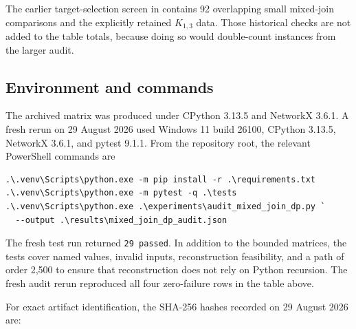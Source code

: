 \documentclass[11pt,a4paper]{article}
\providecommand{\Needspace}[1]{}
\numberwithin{equation}{section}
\begin{document}
The earlier target-selection screen in
 contains 92
overlapping small mixed-join comparisons and the explicitly retained
\(K_{1,3}\) data. Those historical checks are not added to the table
totals, because doing so would double-count instances from the larger
audit.

\subsection{Environment and commands}\label{sec:environment}

The archived matrix was produced under CPython 3.13.5 and NetworkX
3.6.1. A fresh rerun on 29 August 2026 used Windows 11 build 26100,
CPython 3.13.5, NetworkX 3.6.1, and pytest 9.1.1. From the repository
root, the relevant PowerShell commands are

\begin{verbatim}
.\.venv\Scripts\python.exe -m pip install -r .\requirements.txt
.\.venv\Scripts\python.exe -m pytest -q .\tests
.\.venv\Scripts\python.exe .\experiments\audit_mixed_join_dp.py `
  --output .\results\mixed_join_dp_audit.json
\end{verbatim}

The fresh test run returned \texttt{29\ passed}. In addition to the
bounded matrices, the tests cover named values, invalid inputs,
reconstruction feasibility, and a path of order 2,500 to ensure that
reconstruction does not rely on Python recursion. The fresh audit rerun
reproduced all four zero-failure rows in the table above.

\Needspace{7\baselineskip}
For exact artifact identification, the SHA-256 hashes recorded on 29
August 2026 are:
\end{document}
